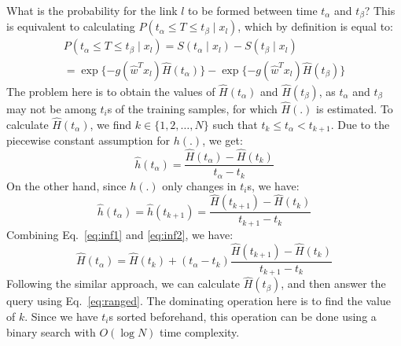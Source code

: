  What is the probability for the link $l$ to be formed between time $t_\alpha$ and $t_\beta$? This is equivalent to calculating $P(t_\alpha \le T \le t_\beta \mid x_l)$, which by definition is equal to:
\begin{equation}\label{eq:ranged}
\begin{split}
P(t_\alpha\le T \le t_\beta \mid x_l) = S(t_\alpha\mid x_l) - S(t_\beta\mid x_l)\\
= \exp\{-g(\hat{w}^Tx_l)\hat{H}(t_\alpha)\} - \exp\{-g(\hat{w}^Tx_l)\hat{H}(t_\beta)\}
\end{split}
\end{equation}
The problem here is to obtain the values of $\hat{H}(t_\alpha)$ and $\hat{H}(t_\beta)$, as $t_\alpha$ and $t_\beta$ may not be among $t_i$s of the training samples, for which $\hat{H}(.)$ is estimated. To calculate $\hat{H}(t_\alpha)$, we find $k\in\{1,2,\dots,N\}$ such that $t_k\le t_\alpha < t_{k+1}$. Due to the piecewise constant assumption for $h(.)$, we get:
\begin{equation}\label{eq:inf1}
\hat{h}(t_\alpha)=\frac{\hat{H}(t_\alpha)-\hat{H}(t_k)}{t_\alpha-t_k}
\end{equation} 
On the other hand, since $h(.)$ only changes in $t_i$s, we have:
\begin{equation}\label{eq:inf2}
\hat{h}(t_\alpha)=\hat{h}(t_{k+1})=\frac{\hat{H}(t_{k+1})-\hat{H}(t_k)}{t_{k+1}-t_k}
\end{equation}
Combining Eq.~\ref{eq:inf1} and \ref{eq:inf2}, we have:
\begin{equation}\label{eq:inf3}
\hat{H}(t_\alpha)=\hat{H}(t_k)+(t_\alpha-t_k)\frac{\hat{H}(t_{k+1})-\hat{H}(t_k)}{t_{k+1}-t_k}
\end{equation}
Following the similar approach, we can calculate $\hat{H}(t_\beta)$, and then answer the query using Eq.~\ref{eq:ranged}. The dominating operation here is to find the value of $k$. Since we have $t_i$s sorted beforehand, this operation can be done using a binary search with $O(\log N)$ time complexity.\\

